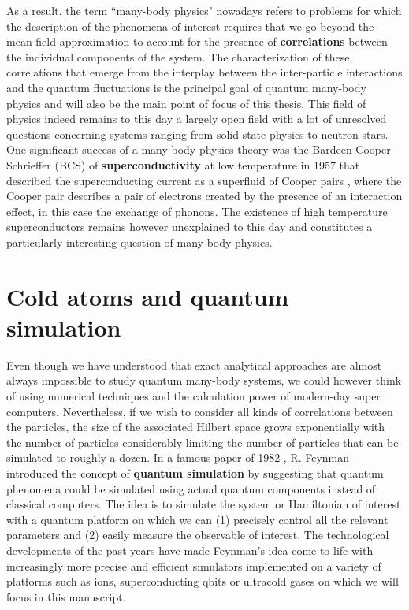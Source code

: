 As a result, the term ``many-body physics" nowadays refers to problems for which the description of the phenomena of interest requires that we go beyond the mean-field approximation to account for the presence of \textbf{correlations} between the individual components of the system. The characterization of these correlations that emerge from the interplay between the inter-particle interactions and the quantum fluctuations is the principal goal of quantum many-body physics and will also be the main point of focus of this thesis. This field of physics indeed remains to this day a largely open field with a lot of unresolved questions concerning systems ranging from solid state physics to neutron stars. One significant success of a many-body physics theory was the Bardeen-Cooper-Schrieffer \cite{bardeen1957theory} (BCS) of \textbf{superconductivity} at low temperature in 1957 that described the superconducting current as a superfluid of Cooper pairs \cite{cooper1956bound}, where the Cooper pair describes a pair of electrons created by the presence of an interaction effect, in this case the exchange of phonons. The existence of high temperature superconductors remains however unexplained to this day and constitutes a particularly interesting question of many-body physics.

\section*{Cold atoms and quantum simulation}

Even though we have understood that exact analytical approaches are almost always impossible to study quantum many-body systems, we could however think of using numerical techniques and the calculation power of modern-day super computers. Nevertheless, if we wish to consider all kinds of correlations between the particles, the size of the associated Hilbert space grows exponentially with the number of particles considerably limiting the number of particles that can be simulated to roughly a dozen. In a famous paper of 1982 \cite{Feynman1982Simulating}, R. Feynman introduced the concept of \textbf{quantum simulation} by suggesting that quantum phenomena could be simulated using actual quantum components instead of classical computers. The idea is to simulate the system or Hamiltonian of interest with a quantum platform on which we can (1) precisely control all the relevant parameters and (2) easily measure the observable of interest. The technological developments of the past years have made Feynman's idea come to life with increasingly more precise and efficient simulators implemented on a variety of platforms such as ions, superconducting qbits or ultracold gases on which we will focus in this manuscript. 

